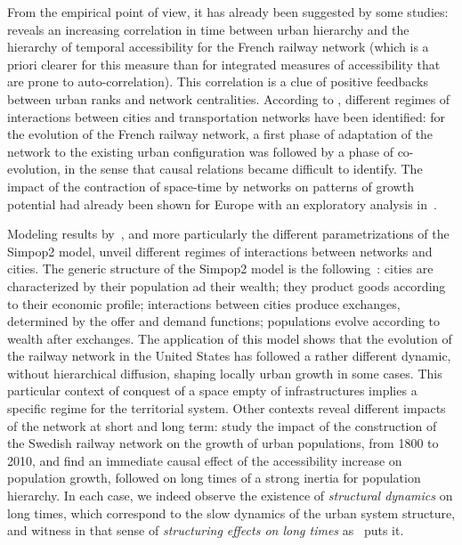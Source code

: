 \documentclass[11pt]{article}
\begin{document}
From the empirical point of view, it has already been suggested by some studies: \cite{bretagnolle2003vitesse} reveals an increasing correlation in time between urban hierarchy and the hierarchy of temporal accessibility for the French railway network (which is a priori clearer for this measure than for integrated measures of accessibility that are prone to auto-correlation). This correlation is a clue of positive feedbacks between urban ranks and network centralities. According to \cite{bretagnolle:tel-00459720}, different regimes of interactions between cities and transportation networks have been identified: for the evolution of the French railway network, a first phase of adaptation of the network to the existing urban configuration was followed by a phase of co-evolution, in the sense that causal relations became difficult to identify. The impact of the contraction of space-time by networks on patterns of growth potential had already been shown for Europe with an exploratory analysis in~\citep{bretagnolle1998space}.

Modeling results by~\cite{bretagnolle2010comparer}, and more particularly the different parametrizations of the Simpop2 model, unveil different regimes of interactions between networks and cities. The generic structure of the Simpop2 model is the following~\citep{pumain2008socio}: cities are characterized by their population ad their wealth; they product goods according to their economic profile; interactions between cities produce exchanges, determined by the offer and demand functions; populations evolve according to wealth after exchanges. The application of this model shows that the evolution of the railway network in the United States has followed a rather different dynamic, without hierarchical diffusion, shaping locally urban growth in some cases. This particular context of conquest of a space empty of infrastructures implies a specific regime for the territorial system. Other contexts reveal different impacts of the network at short and long term: \cite{berger2017locomotives} study the impact of the construction of the Swedish railway network on the growth of urban populations, from 1800 to 2010, and find an immediate causal effect of the accessibility increase on population growth, followed on long times of a strong inertia for population hierarchy. In each case, we indeed observe the existence of \emph{structural dynamics} on long times, which correspond to the slow dynamics of the urban system structure, and witness in that sense of \emph{structuring effects on long times} as~\cite{pumain2014effets} puts it.
\end{document}
